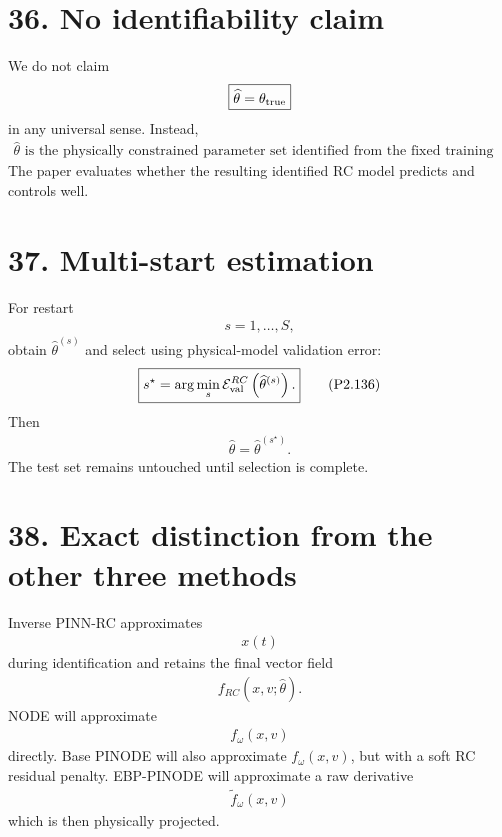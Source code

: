 \documentclass[11pt]{article}
\begin{document}
\section*{36. No identifiability claim}
We do not claim
\begin{align}
\boxed{\widehat\theta=\theta_{\rm true}}
\end{align}
in any universal sense. Instead,
\begin{align}
\boxed{\widehat\theta\text{ is the physically constrained parameter set identified from the fixed training data and architecture.}}
\tag{P2.135}
\end{align}
The paper evaluates whether the resulting identified RC model predicts and controls well.

\section*{37. Multi-start estimation}
For restart
\begin{align}
s=1,\ldots,S,
\end{align}
obtain \(\widehat\theta^{(s)}\) and select using physical-model validation error:
\begin{align}
\boxed{s^\star=\arg\min_s\mathcal E_{\rm val}^{RC}\left(\widehat\theta^{(s)}\right).}
\tag{P2.136}
\end{align}
Then
\begin{align}
\boxed{\widehat\theta=\widehat\theta^{(s^\star)}.}
\tag{P2.137}
\end{align}
The test set remains untouched until selection is complete.

\section*{38. Exact distinction from the other three methods}
Inverse PINN-RC approximates
\begin{align}
\boxed{x(t)}
\end{align}
during identification and retains the final vector field
\begin{align}
\boxed{f_{RC}(x,v;\widehat\theta).}
\end{align}
NODE will approximate
\begin{align}
\boxed{f_\omega(x,v)}
\end{align}
directly. Base PINODE will also approximate \(f_\omega(x,v)\), but with a soft RC residual penalty. EBP-PINODE will approximate a raw derivative
\begin{align}
\widetilde f_\omega(x,v)
\end{align}
which is then physically projected.
\end{document}
